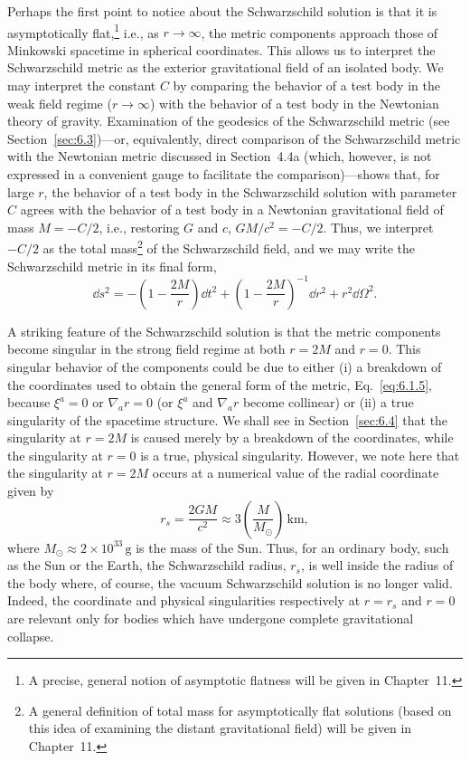 Perhaps the first point to notice about the Schwarzschild solution is that it is
asymptotically flat,\footnote{A precise, general notion of asymptotic flatness
will be given in Chapter~11.} i.e., as \(r\to\infty\), the metric components
approach those of Minkowski spacetime in spherical coordinates. This allows us to
interpret the Schwarzschild metric as the exterior gravitational field of an
isolated body. We may interpret the constant \(C\) by comparing the behavior of a
test body in the weak field regime (\(r\to\infty\)) with the behavior of a test
body in the Newtonian theory of gravity. Examination of the geodesics of the
Schwarzschild metric (see Section~\ref{sec:6.3})---or, equivalently, direct
comparison of the Schwarzschild metric with the Newtonian metric discussed in
Section~4.4a (which, however, is not expressed in a convenient gauge to
facilitate the comparison)---shows that, for large \(r\), the behavior of a test
body in the Schwarzschild solution with parameter \(C\) agrees with the behavior
of a test body in a Newtonian gravitational field of mass \(M=-C/2\), i.e.,
restoring \(G\) and \(c\), \(GM/c^2=-C/2\). Thus, we interpret \(-C/2\) as the
total mass\footnote{A general definition of total mass for asymptotically flat
solutions (based on this idea of examining the distant gravitational field) will
be given in Chapter~11.} of the Schwarzschild field, and we may write the
Schwarzschild metric in its final form,
\begin{equation}
  \dd s^2=-\left(1-\frac{2M}{r}\right)\dd t^2+
  \left(1-\frac{2M}{r}\right)^{-1}\dd r^2+r^2\dd\Omega^2.
  \tag{6.1.44}\label{eq:6.1.44}
\end{equation}

A striking feature of the Schwarzschild solution is that the metric components
become singular in the strong field regime at both \(r=2M\) and \(r=0\). This
singular behavior of the components could be due to either (i) a breakdown of the
coordinates used to obtain the general form of the metric, Eq.~\eqref{eq:6.1.5},
because \(\xi^a=0\) or \(\nabla_a r=0\) (or \(\xi^a\) and \(\nabla_a r\) become
collinear) or (ii) a true singularity of the spacetime structure. We shall see in
Section~\ref{sec:6.4} that the singularity at \(r=2M\) is caused merely by a
breakdown of the coordinates, while the singularity at \(r=0\) is a true,
physical singularity. However, we note here that the singularity at \(r=2M\)
occurs at a numerical value of the radial coordinate given by
\begin{equation}
  r_s=\frac{2GM}{c^2}\approx3\left(\frac{M}{M_\odot}\right)\,\mathrm{km},
  \tag{6.1.45}\label{eq:6.1.45}
\end{equation}
where \(M_\odot\approx2\times10^{33}\,\mathrm{g}\) is the mass of the Sun. Thus,
for an ordinary body, such as the Sun or the Earth, the Schwarzschild radius,
\(r_s\), is well inside the radius of the body where, of course, the vacuum
Schwarzschild solution is no longer valid. Indeed, the coordinate and physical
singularities respectively at \(r=r_s\) and \(r=0\) are relevant only for bodies
which have undergone complete gravitational collapse.

